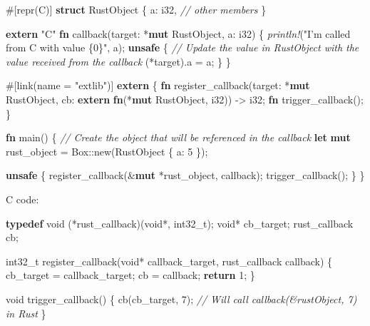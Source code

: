 \documentclass[a4paper,]{book}
\newenvironment{Shaded}{\begin{snugshade}}{\end{snugshade}}
\newcommand{\KeywordTok}[1]{\textcolor[rgb]{0.13,0.29,0.53}{\textbf{{#1}}}}
\newcommand{\DataTypeTok}[1]{\textcolor[rgb]{0.13,0.29,0.53}{{#1}}}
\newcommand{\DecValTok}[1]{\textcolor[rgb]{0.00,0.00,0.81}{{#1}}}
\newcommand{\StringTok}[1]{\textcolor[rgb]{0.31,0.60,0.02}{{#1}}}
\newcommand{\CommentTok}[1]{\textcolor[rgb]{0.56,0.35,0.01}{\textit{{#1}}}}
\newcommand{\PreprocessorTok}[1]{\textcolor[rgb]{0.56,0.35,0.01}{\textit{{#1}}}}
\newcommand{\AttributeTok}[1]{\textcolor[rgb]{0.77,0.63,0.00}{{#1}}}
\newcommand{\NormalTok}[1]{{#1}}
\begin{document}
\begin{Shaded}
\begin{Highlighting}[]
\AttributeTok{#[}\NormalTok{repr}\AttributeTok{(}\NormalTok{C}\AttributeTok{)]}
\KeywordTok{struct} \NormalTok{RustObject \{}
    \NormalTok{a: }\DataTypeTok{i32}\NormalTok{,}
    \CommentTok{// other members}
\NormalTok{\}}

\KeywordTok{extern} \StringTok{"C"} \KeywordTok{fn} \NormalTok{callback(target: *}\KeywordTok{mut} \NormalTok{RustObject, a: }\DataTypeTok{i32}\NormalTok{) \{}
    \PreprocessorTok{println!}\NormalTok{(}\StringTok{"I'm called from C with value \{0\}"}\NormalTok{, a);}
    \KeywordTok{unsafe} \NormalTok{\{}
        \CommentTok{// Update the value in RustObject with the value received from the callback}
        \NormalTok{(*target).a = a;}
    \NormalTok{\}}
\NormalTok{\}}

\AttributeTok{#[}\NormalTok{link}\AttributeTok{(}\NormalTok{name }\AttributeTok{=} \StringTok{"extlib"}\AttributeTok{)]}
\KeywordTok{extern} \NormalTok{\{}
   \KeywordTok{fn} \NormalTok{register_callback(target: *}\KeywordTok{mut} \NormalTok{RustObject,}
                        \NormalTok{cb: }\KeywordTok{extern} \KeywordTok{fn}\NormalTok{(*}\KeywordTok{mut} \NormalTok{RustObject, }\DataTypeTok{i32}\NormalTok{)) -> }\DataTypeTok{i32}\NormalTok{;}
   \KeywordTok{fn} \NormalTok{trigger_callback();}
\NormalTok{\}}

\KeywordTok{fn} \NormalTok{main() \{}
    \CommentTok{// Create the object that will be referenced in the callback}
    \KeywordTok{let} \KeywordTok{mut} \NormalTok{rust_object = }\DataTypeTok{Box}\NormalTok{::new(RustObject \{ a: }\DecValTok{5} \NormalTok{\});}

    \KeywordTok{unsafe} \NormalTok{\{}
        \NormalTok{register_callback(&}\KeywordTok{mut} \NormalTok{*rust_object, callback);}
        \NormalTok{trigger_callback();}
    \NormalTok{\}}
\NormalTok{\}}
\end{Highlighting}
\end{Shaded}

C code:

\begin{Shaded}
\begin{Highlighting}[]
\KeywordTok{typedef} \DataTypeTok{void} \NormalTok{(*rust_callback)(}\DataTypeTok{void}\NormalTok{*, }\DataTypeTok{int32_t}\NormalTok{);}
\DataTypeTok{void}\NormalTok{* cb_target;}
\NormalTok{rust_callback cb;}

\DataTypeTok{int32_t} \NormalTok{register_callback(}\DataTypeTok{void}\NormalTok{* callback_target, rust_callback callback) \{}
    \NormalTok{cb_target = callback_target;}
    \NormalTok{cb = callback;}
    \KeywordTok{return} \DecValTok{1}\NormalTok{;}
\NormalTok{\}}

\DataTypeTok{void} \NormalTok{trigger_callback() \{}
  \NormalTok{cb(cb_target, }\DecValTok{7}\NormalTok{); }\CommentTok{// Will call callback(&rustObject, 7) in Rust}
\NormalTok{\}}
\end{Highlighting}
\end{Shaded}
\end{document}

